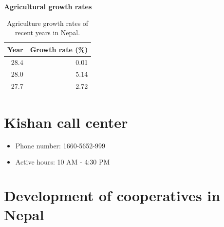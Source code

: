 \documentclass[
  openany]{book}
\providecommand{\tightlist}{%
  \setlength{\itemsep}{0pt}\setlength{\parskip}{0pt}}
\begin{document}
\textbf{Agricultural growth rates}

\begin{table}

\caption{\label{tab:unnamed-chunk-3}Agriculture growth rates of recent years in Nepal.}
\centering
\begin{tabular}[t]{rr}
\toprule
Year & Growth rate (\%)\\
\midrule
28.4 & 0.01\\
28.0 & 5.14\\
27.7 & 2.72\\
\bottomrule
\end{tabular}
\end{table}

\hypertarget{kishan-call-center}{%
\section{Kishan call center}\label{kishan-call-center}}

\begin{itemize}
\tightlist
\item
  Phone number: 1660-5652-999
\item
  Active hours: 10 AM - 4:30 PM
\end{itemize}

\hypertarget{development-of-cooperatives-in-nepal}{%
\section{Development of cooperatives in Nepal}\label{development-of-cooperatives-in-nepal}}
\end{document}
